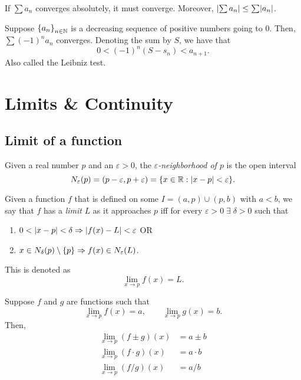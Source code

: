\documentclass[12pt]{article}
\begin{document}
\begin{thm} \label{thm:series:absolute=>conditional}
    If $\sum a_{n}$ converges absolutely, it must converge. Moreover, $\abs{\sum a_{n}} \leq \sum \abs{a_{n}}$.
\end{thm}

\begin{thm} \label{thm:series:AST}
    Suppose $\set{a_{n}}_{n \in \N}$ is a decreasing sequence of positive numbers going to 0.
    Then, $\sum (-1)^{n} a_{n}$ converges.
    Denoting the sum by $S$, we have that \[
        0 < (-1)^{n}(S - s_{n}) < a_{n+1}.
    \] Also called the Leibniz test.
\end{thm}

\section{Limits \& Continuity}

\subsection{Limit of a function}

\begin{defn}[Neighborhood] \label{defn:limit:neighborhood}
    Given a real number $p$ and an $\varepsilon > 0$, the \emph{$\varepsilon$-neighborhood of $p$} is the open interval \[
        N_{\varepsilon}(p) = \paren{p - \varepsilon, p + \varepsilon} = \set{x \in \R : \abs{ x - p} < \varepsilon}.
    \] 
\end{defn}

\begin{defn} \label{defn:limit:function}
    Given a function $f$ that is defined on some $I = (a, p) \cup (p, b)$ with $a < b$, we say that $f$ has a \emph{limit} $L$ as it approaches $p$ iff for every $\varepsilon > 0 \;\exists\; \delta > 0$ such that
    \begin{enumerate}[label=(\alph*)]
        \item $0 < \abs{ x - p } < \delta \implies \abs{ f(x) - L } < \varepsilon$ OR
        \item $x \in N_{\delta}(p) \setminus \set{p} \implies f(x) \in N_{\varepsilon}(L)$.
    \end{enumerate}
    This is denoted as \[
        \lim_{x \to p} f(x) = L.
    \]
\end{defn}

\begin{thm} \label{thm:limit:laws}
    Suppose $f$ and $g$ are functions such that \[
        \lim_{x \to p} f(x) = a, \qquad \lim_{x \to p} g(x) = b.
    \] Then,
    \begin{align}
        \lim_{x \to p} (f \pm g)(x) &= a \pm b \\
        \lim_{x \to p} (f \cdot g)(x) &= a \cdot b \\
        \lim_{x \to p} (f/g)(x) &= a/b
    \end{align}
\end{thm}
\end{document}
